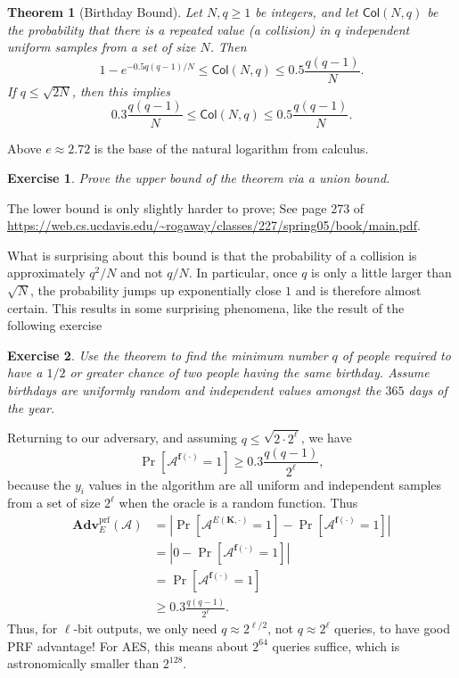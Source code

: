 \documentclass[11pt]{article}
\newtheorem{exercise}{Exercise}
\newtheorem{theorem}{Theorem}
\newcommand{\calA}{\mathcal{A}}
\newcommand{\Adv}{\mathbf{Adv}}
\newcommand{\AdvPRF}[2]{\Adv^{\mathrm{prf}}_{#1}({#2})}
\newcommand{\bK}{\mathbf{K}}
\newcommand{\bof}{\mathbf{f}}
\newcommand{\Col}{\mathsf{Col}}
\begin{document}
\begin{theorem}[Birthday Bound]
    Let $N,q\geq 1$ be integers, and let $\Col(N,q)$ be the probability that
    there is a repeated value (a \emph{collision}) in $q$ independent uniform
    samples from a set of size $N$. Then
    \[
        1 - e^{-0.5 q(q-1)/N} \leq \Col(N,q) \leq 0.5\frac{q(q-1)}{N}.
    \]
    If $q\leq \sqrt{2N}$, then this implies
    \[
        0.3 \frac{q(q-1)}{N} \leq \Col(N,q) \leq 0.5\frac{q(q-1)}{N}.
    \]
\end{theorem}
Above $e\approx 2.72$ is the base of the natural logarithm from calculus.
\begin{exercise}
    Prove the upper bound of the theorem via a union bound.
\end{exercise}
The lower bound is only slightly harder to prove; See page 273 of
\url{https://web.cs.ucdavis.edu/~rogaway/classes/227/spring05/book/main.pdf}.

What is surprising about this bound is that the probability of a collision
is approximately $q^2/N$ and not $q/N$. In particular, once $q$ is only
a little larger than $\sqrt{N}$, the probability jumps up exponentially close
$1$ and is therefore almost certain. This results in some surprising
phenomena, like the result of the following exercise
\begin{exercise}
    Use the theorem to find the minimum number $q$ of people required to have
    a $1/2$ or greater chance of two people having the same birthday. Assume
    birthdays are uniformly random and independent values amongst the
    $365$ days of the year.
\end{exercise}

Returning to our adversary, and assuming $q\leq \sqrt{2\cdot 2^\ell}$, we
have
\[
    \Pr[\calA^{\bof(\cdot)}=1] \geq 0.3 \frac{q(q-1)}{2^\ell},
\]
because the $y_i$ values in the algorithm are all uniform and independent
samples from a set of size $2^\ell$ when the oracle is a random function. 
Thus
\begin{align*}
    \AdvPRF{E}{\calA} 
    & = \left|\Pr[\calA^{E(\bK,\cdot)}=1]-\Pr[\calA^{\bof(\cdot)}=1]\right| \\
    & = \left|0-\Pr[\calA^{\bof(\cdot)}=1]\right| \\
    & = \Pr[\calA^{\bof(\cdot)}=1] \\
    & \geq  0.3 \frac{q(q-1)}{2^\ell}.
\end{align*}
Thus, for $\ell$-bit outputs, we only need $q\approx 2^{\ell/2}$, not
$q\approx 2^{\ell}$ queries, to have good PRF advantage! For AES, this
means about $2^{64}$ queries suffice, which is astronomically smaller
than $2^{128}$.
\end{document}

